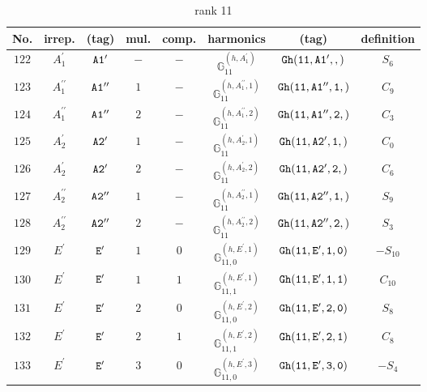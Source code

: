 \documentclass[fleqn,8pt]{jsarticle}
\begin{document}
\begin{table}[ht!]
\begin{center}
\caption{rank 11}
\renewcommand{\arraystretch}{1.3}
\begin{tabular}{cccccccc} \hline \hline
No. & irrep. & (tag) & mul. & comp. & harmonics & (tag) & definition \\ \hline
$ 122 $ & $ A_{1}^{\prime} $ & $ {\tt A1'} $ & $ - $ & $ - $ & $ \mathbb{G}_{11}^{(h,A_{1}^{\prime})} $ & $ {\tt Gh(11,A1',,)} $ & $ S_{6} $ \\
$ 123 $ & $ A_{1}^{\prime\prime} $ & $ {\tt A1''} $ & $ 1 $ & $ - $ & $ \mathbb{G}_{11}^{(h,A_{1}^{\prime\prime},1)} $ & $ {\tt Gh(11,A1'',1,)} $ & $ C_{9} $ \\
$ 124 $ & $ A_{1}^{\prime\prime} $ & $ {\tt A1''} $ & $ 2 $ & $ - $ & $ \mathbb{G}_{11}^{(h,A_{1}^{\prime\prime},2)} $ & $ {\tt Gh(11,A1'',2,)} $ & $ C_{3} $ \\
$ 125 $ & $ A_{2}^{\prime} $ & $ {\tt A2'} $ & $ 1 $ & $ - $ & $ \mathbb{G}_{11}^{(h,A_{2}^{\prime},1)} $ & $ {\tt Gh(11,A2',1,)} $ & $ C_{0} $ \\
$ 126 $ & $ A_{2}^{\prime} $ & $ {\tt A2'} $ & $ 2 $ & $ - $ & $ \mathbb{G}_{11}^{(h,A_{2}^{\prime},2)} $ & $ {\tt Gh(11,A2',2,)} $ & $ C_{6} $ \\
$ 127 $ & $ A_{2}^{\prime\prime} $ & $ {\tt A2''} $ & $ 1 $ & $ - $ & $ \mathbb{G}_{11}^{(h,A_{2}^{\prime\prime},1)} $ & $ {\tt Gh(11,A2'',1,)} $ & $ S_{9} $ \\
$ 128 $ & $ A_{2}^{\prime\prime} $ & $ {\tt A2''} $ & $ 2 $ & $ - $ & $ \mathbb{G}_{11}^{(h,A_{2}^{\prime\prime},2)} $ & $ {\tt Gh(11,A2'',2,)} $ & $ S_{3} $ \\
$ 129 $ & $ E^{\prime} $ & $ {\tt E'} $ & $ 1 $ & $ 0 $ & $ \mathbb{G}_{11,0}^{(h,E^{\prime},1)} $ & $ {\tt Gh(11,E',1,0)} $ & $ - S_{10} $ \\
$ 130 $ & $ E^{\prime} $ & $ {\tt E'} $ & $ 1 $ & $ 1 $ & $ \mathbb{G}_{11,1}^{(h,E^{\prime},1)} $ & $ {\tt Gh(11,E',1,1)} $ & $ C_{10} $ \\
$ 131 $ & $ E^{\prime} $ & $ {\tt E'} $ & $ 2 $ & $ 0 $ & $ \mathbb{G}_{11,0}^{(h,E^{\prime},2)} $ & $ {\tt Gh(11,E',2,0)} $ & $ S_{8} $ \\
$ 132 $ & $ E^{\prime} $ & $ {\tt E'} $ & $ 2 $ & $ 1 $ & $ \mathbb{G}_{11,1}^{(h,E^{\prime},2)} $ & $ {\tt Gh(11,E',2,1)} $ & $ C_{8} $ \\
$ 133 $ & $ E^{\prime} $ & $ {\tt E'} $ & $ 3 $ & $ 0 $ & $ \mathbb{G}_{11,0}^{(h,E^{\prime},3)} $ & $ {\tt Gh(11,E',3,0)} $ & $ - S_{4} $ \\

\end{tabular}
\end{center}
\end{table}
\end{document}
